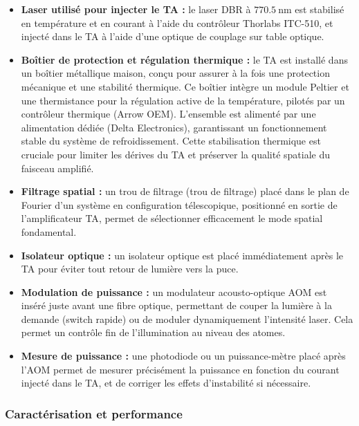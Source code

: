 \begin{itemize}[label=$\triangleright$]
    \item \textbf{Laser utilisé pour injecter le TA :} le laser DBR à $770.5~\text{nm}$ est stabilisé en température et en courant à l’aide du contrôleur Thorlabs ITC-510, et injecté dans le \gls*{TA} à l’aide d’une optique de couplage sur table optique.
    
    \item \textbf{Boîtier de protection et régulation thermique :} le TA est installé dans un boîtier métallique maison, conçu pour assurer à la fois une protection mécanique et une stabilité thermique. Ce boîtier intègre un module Peltier et une thermistance pour la régulation active de la température, pilotés par un contrôleur thermique (Arrow OEM). L’ensemble est alimenté par une alimentation dédiée (Delta Electronics), garantissant un fonctionnement stable du système de refroidissement. Cette stabilisation thermique est cruciale pour limiter les dérives du TA et préserver la qualité spatiale du faisceau amplifié.

    \item \textbf{Filtrage spatial :} un trou de filtrage (trou de filtrage) placé dans le plan de Fourier d’un système en configuration télescopique, positionné en sortie de l’amplificateur \gls{TA}, permet de sélectionner efficacement le mode spatial fondamental.

    \item \textbf{Isolateur optique :} un isolateur optique est placé immédiatement après le \gls{TA} pour éviter tout retour de lumière vers la puce.

    \item \textbf{Modulation de puissance :} un modulateur acousto-optique \gls{AOM} est inséré juste avant une fibre optique, permettant de couper la lumière à la demande (switch rapide) ou de moduler dynamiquement l’intensité laser. Cela permet un contrôle fin de l’illumination au niveau des atomes.
    
    \item \textbf{Mesure de puissance :} une photodiode ou un puissance-mètre placé après l’\gls{AOM} permet de mesurer précisément la puissance en fonction du courant injecté dans le \gls{TA}, et de corriger les effets d’instabilité si nécessaire.

\end{itemize}

\subsubsection*{Caractérisation et performance}

